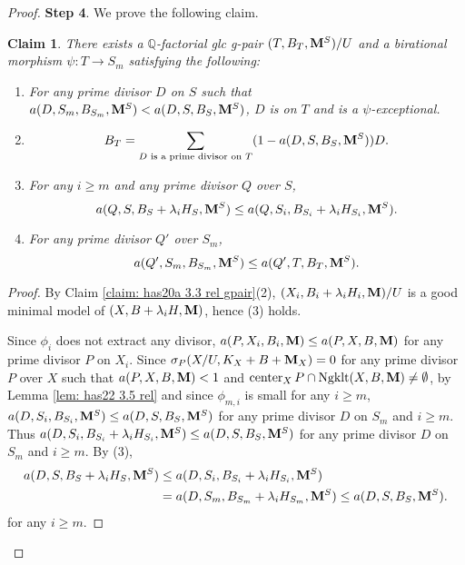 \documentclass[11pt]{amsart}
\numberwithin{equation}{section}
\newcommand{\Mm}{{\bf{M}}}
\newcommand{\Qq}{\mathbb{Q}}
\newcommand{\Center}{\operatorname{center}}
\newcommand{\Ngklt}{\operatorname{Ngklt}}
\newtheorem{claim}[thm]{Claim}
\theoremstyle{definition}
\theoremstyle{definition}
\theoremstyle{definition}
\begin{document}
\begin{proof}
\medskip\noindent\textbf{Step 4}. We prove the following claim.

\begin{claim}\label{claim: has22 3.14 step 4 abcd}
There exists a $\Qq$-factorial glc g-pair $(T,B_T,\Mm^S)/U$ and a birational morphism $\psi: T\rightarrow S_m$ satisfying the following:
\begin{enumerate}
    \item For any prime divisor $D$ on $S$ such that $a(D,S_m,B_{S_m},\Mm^S)<a(D,S,B_S,\Mm^S)$, $D$ is on $T$ and is a $\psi$-exceptional.
    \item $$B_T=\sum_{D\text{ is a prime divisor on }T}(1-a(D,S,B_S,\Mm^S))D.$$
    \item For any $i\geq m$ and any prime divisor $Q$ over $S$, $$a(Q,S,B_S+\lambda_iH_S,\Mm^S)\leq a(Q,S_i,B_{S_i}+\lambda_iH_{S_i},\Mm^S).$$
    \item For any prime divisor $Q'$ over $S_m$,
    $$a(Q',S_m,B_{S_m},\Mm^S)\leq a(Q',T,B_T,\Mm^S).$$
\end{enumerate}
\end{claim}
\begin{proof}
By Claim \ref{claim: has20a 3.3 rel gpair}(2), $(X_i,B_i+\lambda_iH_i,\Mm)/U$ is a good minimal model of $(X,B+\lambda_iH,\Mm)$, hence (3) holds.

Since $\phi_i$ does not extract any divisor, $a(P,X_i,B_i,\Mm)\leq a(P,X,B,\Mm)$ for any prime divisor $P$ on $X_i$. Since  $\sigma_P(X/U,K_X+B+\Mm_X)=0$ for any prime divisor $P$ over $X$ such that $a(P,X,B,\Mm)<1$ and $\Center_XP\cap\Ngklt(X,B,\Mm)\not=\emptyset$, by Lemma \ref{lem: has22 3.5 rel} and since $\phi_{m,i}$ is small for any $i\geq m$, $a(D,S_i,B_{S_i},\Mm^S)\leq a(D,S,B_S,\Mm^S)$ for any prime divisor $D$ on $S_m$ and $i\geq m$. Thus  $a(D,S_i,B_{S_i}+\lambda_iH_{S_i},\Mm^S)\leq a(D,S,B_S,\Mm^S)$ for any prime divisor $D$ on $S_m$ and $i\geq m$. By (3), 
\begin{align*}
    a(D,S,B_S+\lambda_iH_S,\Mm^S)&\leq a(D,S_i,B_{S_i}+\lambda_iH_{S_i},\Mm^S)\\
    &=a(D,S_m,B_{S_m}+\lambda_iH_{S_m},\Mm^S)\leq a(D,S,B_S,\Mm^S).
\end{align*}
for any $i\geq m$. 


\end{proof}
\end{proof}
\end{document}
